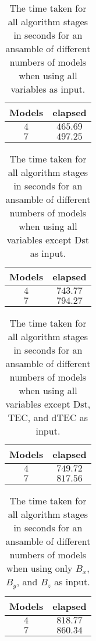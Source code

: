 \begin{table}[!ht]
	\centering
	\begin{tabular}{|c|c|}
		\hline
		Models & elapsed \\ \hline
		$4$ & $465.69$ \\ \hline
		$7$ & $497.25$ \\ \hline
	\end{tabular}
	\caption{The time taken for all algorithm stages in seconds for an ansamble of different numbers of models when using all variables as input.}
	\label{tab:time:ansamble:all}
\end{table}

\begin{table}[!ht]
	\centering
	\begin{tabular}{|c|c|}
		\hline
		Models & elapsed \\ \hline
		$4$ & $743.77$ \\ \hline
		$7$ & $794.27$ \\ \hline
	\end{tabular}
	\caption{The time taken for all algorithm stages in seconds for an ansamble of different numbers of models when using all variables except Dst as input.}
	\label{tab:time:ansamble:noDst}
\end{table}

\begin{table}[!ht]
	\centering
	\begin{tabular}{|c|c|}
		\hline
		Models & elapsed \\ \hline
		$4$ & $749.72$ \\ \hline
		$7$ & $817.56$ \\ \hline
	\end{tabular}
	\caption{The time taken for all algorithm stages in seconds for an ansamble of different numbers of models when using all variables except Dst, TEC, and dTEC as input.}
	\label{tab:time:ansamble:noTEC}
\end{table}

\begin{table}[!ht]
	\centering
	\begin{tabular}{|c|c|}
		\hline
		Models & elapsed \\ \hline
		$4$ & $818.77$ \\ \hline
		$7$ & $860.34$ \\ \hline
	\end{tabular}
	\caption{The time taken for all algorithm stages in seconds for an ansamble of different numbers of models when using only $B_{x}$, $B_{y}$, and $B_{z}$ as input.}
	\label{tab:time:ansamble:coord}
\end{table}

